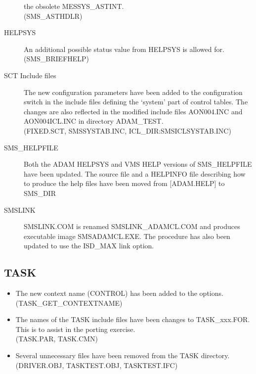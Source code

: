 \begin{description}
the obsolete MESSYS\_ASTINT.\\
(SMS\_ASTHDLR)
\item[HELPSYS] An additional possible status value from HELPSYS is allowed
for.\\
(SMS\_BRIEFHELP)
\item[SCT Include files] The new configuration parameters have been added to 
the configuration switch in the include files defining the `system' part of 
control tables.
The changes are also reflected in the modified include files
AON004.INC and AON004ICL.INC in directory ADAM\_TEST.\\
(FIXED.SCT, SMSSYSTAB.INC, ICL\_DIR:SMSICLSYSTAB.INC)
\item[SMS\_HELPFILE] Both the ADAM HELPSYS and VMS HELP versions of 
SMS\_HELPFILE have been updated. The source file and a HELPINFO file describing
how to produce the help files have been moved from [ADAM.HELP] to SMS\_DIR 
\item[SMSLINK] SMSLINK.COM is renamed SMSLINK\_ADAMCL.COM and produces 
executable image SMSADAMCL.EXE. 
The procedure has also been updated to use the ISD\_MAX link option.
\end{description}

\subsection{TASK}
\begin{itemize}
\item The new context name (CONTROL) has been added to the options.\\
(TASK\_GET\_CONTEXTNAME)
\item The names of the TASK include files have been changes to TASK\_xxx.FOR.
This is to assist in the porting exercise.\\
(TASK.PAR, TASK.CMN)
\item Several unnecessary files have been removed from the TASK directory.\\
(DRIVER.OBJ, TASKTEST.OBJ, TASKTEST.IFC)
\end{itemize}

